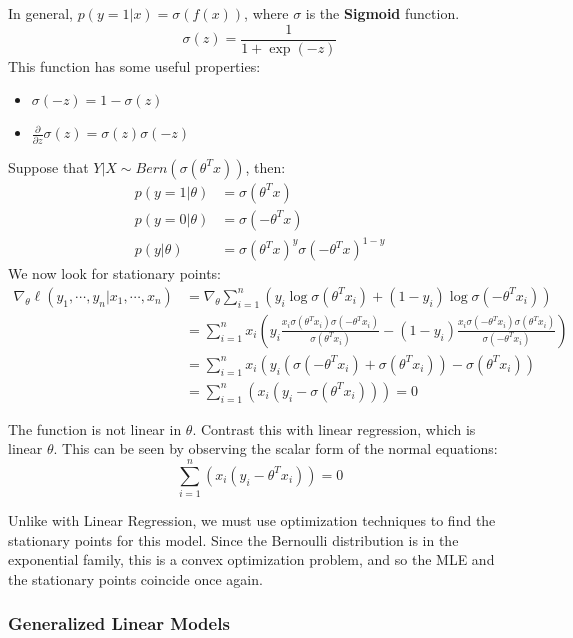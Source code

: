 \documentclass[]{article}
\theoremstyle{mattstyle}
\theoremstyle{definition}
\begin{document}
\newpage
In general, $p(y=1|x)=\sigma(f(x))$, where $\sigma$ is the \textbf{Sigmoid} function. 
$$\sigma(z) = \frac{1}{1+\exp(-z)}$$
This function has some useful properties:
\begin{itemize}
	\item $\sigma(-z) = 1-\sigma(z)$
	\item $ \frac{\partial}{\partial z}\sigma(z) = \sigma(z)\sigma(-z)$
\end{itemize}
Suppose that $Y|X \sim Bern(\sigma(\theta^Tx))$, then:
\begin{align*}
p(y=1|\theta) &= \sigma(\theta^Tx)\\
p(y=0|\theta) &= \sigma(-\theta^Tx)\\
p(y|\theta) &= \sigma(\theta^Tx)^y\sigma(-\theta^Tx)^{1-y}
\end{align*}
We now look for stationary points:
\begin{align*}
\nabla_{\theta} \ell(y_1, \cdots, y_n | x_1, \cdots, x_n) &= \nabla_{\theta}\sum_{i=1}^n\left(y_i \log \sigma(\theta^Tx_i) + (1-y_i)\log \sigma(-\theta^Tx_i) \right)\\
&= \sum_{i=1}^n x_i\left( y_i \frac{x_i\sigma(\theta^Tx_i)\sigma(-\theta^Tx_i)}{\sigma(\theta^Tx_i)} -(1-y_i) \frac{x_i\sigma(-\theta^Tx_i)\sigma(\theta^Tx_i)}{\sigma(-\theta^Tx_i)}\right)\\
&=\sum_{i=1}^n x_i\left( y_i\left(\sigma(-\theta^Tx_i) + \sigma(\theta^Tx_i)\right) - \sigma(\theta^Tx_i) \right)\\
&=\sum_{i=1}^n\left( x_i(y_i - \sigma(\theta^Tx_i)) \right)=0
\end{align*}

The function is not linear in $\theta$. Contrast this with linear regression, which is linear $\theta$. This can be seen by observing the scalar form of the normal equations:
$$\sum_{i=1}^n\left( x_i(y_i - \theta^Tx_i) \right)=0$$

Unlike with Linear Regression, we must use optimization techniques to find the stationary points for this model. Since the Bernoulli distribution is in the exponential family, this is a convex optimization problem, and so the MLE and the stationary points coincide once again.

\newpage
\subsubsection{Generalized Linear Models}
\end{document}
